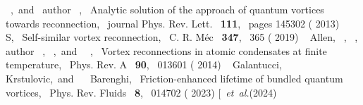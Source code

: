 \documentclass[%
 reprint,
unsortedaddress,
 amsmath,amssymb,
 aps,
 prl,
]{revtex4-2}
\begin{document}
\begin{thebibliography}{38}
{	   {~},\ and\ \bibinfo
	  {author} {~},\ }
	  { {Analytic solution of the approach of quantum vortices
	  towards reconnection},\ }\href@noop {} { {\bibinfo
	  {journal} {Phys. Rev. Lett.}\ }\textbf { {111}},\ \bibinfo
	  {pages} {145302} ( {2013})}%
	  \BibitemOpen
	   { {~\bibnamefont
	  {S}},\ } { {Self-similar vortex
	  reconnection},\ }\href@noop {} { { {C.
	  R. M\'{e}c}\ }\textbf { {347}},\  {365}
	  ( {2019})}%
	  \BibitemOpen
	   { {\ \bibnamefont
	  {Allen}},  {~},
	   {~}, \bibinfo
	  {author} {\ }, 
	  {\ },\ and\ 
	  {\ },\ }
	  { {Vortex reconnections in atomic condensates at finite
	  temperature},\ }\href@noop {} { {
	  {Phys. Rev. A}\ }\textbf { {90}},\  {013601}
	  ( {2014})}%
	  \BibitemOpen
	   { {~\bibnamefont
	  {Galantucci}},  {~\bibnamefont
	  {Krstulovic}},\ and\  {~\bibnamefont
	  {Barenghi}},\ } { {Friction-enhanced
	  lifetime of bundled quantum vortices},\ }\href@noop {} {
	  { {Phys. Rev. Fluids}\ }\textbf { {8}},\
	   {014702} ( {2023})}%
	\bibitem [{\citenamefont {Stasiak}\ \emph {et~al.}(2024)\citenamefont
}
\end{thebibliography}
\end{document}
